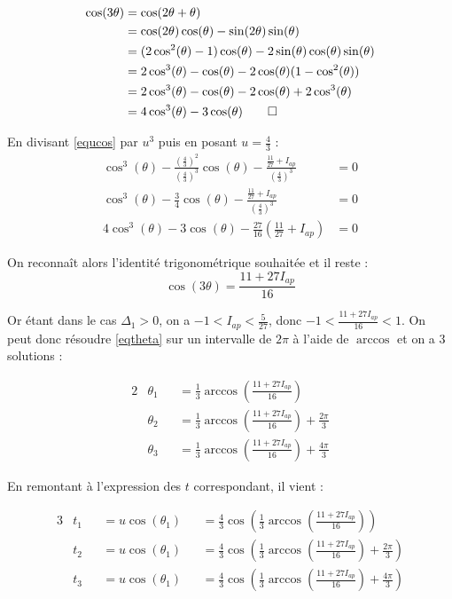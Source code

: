 \documentclass[12pt,a4paper,onecolumn]{article}
\begin{document}
\begin{align*}
  \cos(3\theta)
  &= \cos(2\theta + \theta)\\
  &= \cos(2\theta)\cos(\theta) - \sin(2\theta)\sin(\theta) \\
  &= (2\cos^2(\theta) - 1)\cos(\theta) - 2\sin(\theta)\cos(\theta)\sin(\theta)\\
  &= 2\cos^3(\theta) - \cos(\theta) - 2\cos(\theta)(1-\cos^2(\theta))\\
  &= 2\cos^3(\theta) - \cos(\theta) - 2\cos(\theta) + 2\cos^3(\theta)\\
  &= 4\cos^3(\theta) - 3\cos(\theta) \qedhere
\end{align*}

En divisant \ref{equcos} par $u^3$ puis en posant $u = \frac{4}{3}$ :
\begin{align*}
\cos^3(\theta) - \frac{\left(\frac{4}{3}\right)^2}{\left(\frac{4}{3}\right)^3}\cos(\theta)-\frac{\frac{11}{27} + I_{ap}}{\left(\frac{4}{3}\right)^3} &= 0 \\
\cos^3(\theta) - \frac{3}{4}\cos(\theta) - \frac{\frac{11}{27} + I_{ap}}{\left(\frac{4}{3}\right)^3}&= 0 \\
4\cos^3(\theta) - 3\cos(\theta) - \frac{27}{16}\left(\frac{11}{27} + I_{ap}\right)&= 0 \tag*{en multipliant par 4}
\end{align*}

On reconnaît alors l'identité trigonométrique souhaitée et il reste :
\begin{equation}
\cos(3\theta) = \frac{11 + 27I_{ap}}{16} \label{eqtheta}
\end{equation}

Or étant dans le cas $\Delta_1 > 0$, on a $-1 < I_{ap} < \frac{5}{27}$, donc $-1 < \frac{11 + 27I_{ap}}{16} < 1$.
On peut donc résoudre \ref{eqtheta} sur un intervalle de $2\pi$ à l'aide de $\arccos$ et on a 3 solutions :

\begin{alignat*}{2}
&\theta_1 &&= \frac{1}{3}\arccos(\frac{11 + 27I_{ap}}{16})\\
&\theta_2 &&= \frac{1}{3}\arccos(\frac{11 + 27I_{ap}}{16}) + \frac{2\pi}{3}\\
&\theta_3 &&= \frac{1}{3}\arccos(\frac{11 + 27I_{ap}}{16}) + \frac{4\pi}{3}
\end{alignat*}

En remontant à l'expression des $t$ correspondant, il vient :

\begin{alignat*}{3}
&t_1 &&= u\cos(\theta_1) &&= \frac{4}{3}\cos(\frac{1}{3}\arccos(\frac{11 + 27I_{ap}}{16}))\\
&t_2 &&= u\cos(\theta_1) &&= \frac{4}{3}\cos(\frac{1}{3}\arccos(\frac{11 + 27I_{ap}}{16}) + \frac{2\pi}{3})\\
&t_3 &&= u\cos(\theta_1) &&= \frac{4}{3}\cos(\frac{1}{3}\arccos(\frac{11 + 27I_{ap}}{16}) + \frac{4\pi}{3})
\end{alignat*}
\end{document}
